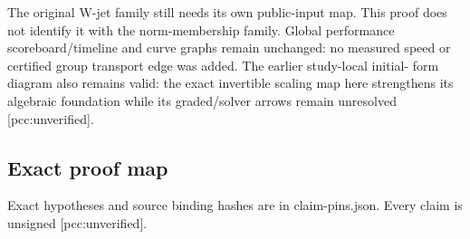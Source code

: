 \documentclass[
  10pt,
]{article}
\begin{document}
The original W-jet family still needs its own public-input map. This
proof does not identify it with the norm-membership family. Global
performance scoreboard/timeline and curve graphs remain unchanged: no
measured speed or certified group transport edge was added. The earlier
study-local initial- form diagram also remains valid: the exact
invertible scaling map here strengthens its algebraic foundation while
its graded/solver arrows remain unresolved {[}pcc:unverified{]}.

\subsection{Exact proof map}\label{exact-proof-map}

Exact hypotheses and source binding hashes are in claim-pins.json. Every
claim is unsigned {[}pcc:unverified{]}.
\end{document}
